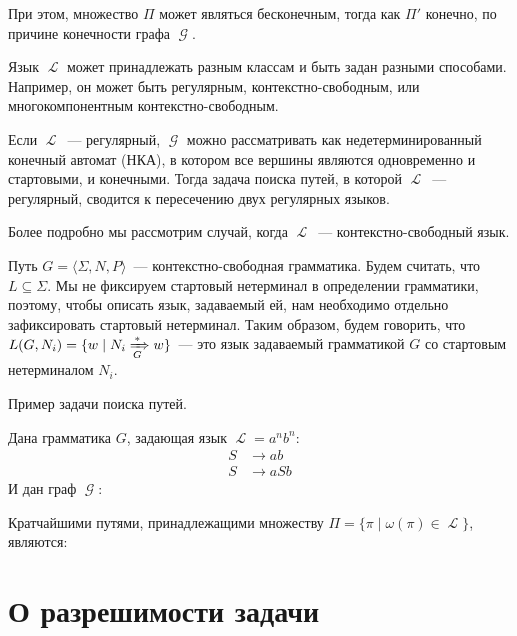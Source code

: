 При этом, множество $\Pi$ может являться бесконечным, тогда как $\Pi'$ конечно, по причине конечности графа $\mscrG$.

Язык $\mscrL$ может принадлежать разным классам и быть задан разными способами.
Например, он может быть регулярным, контекстно-свободным, или многокомпонентным контекстно-свободным.

Если $\mscrL$~--- регулярный, $\mscrG$ можно рассматривать как недетерминированный конечный автомат (НКА), в котором все вершины являются одновременно и стартовыми, и конечными.
Тогда задача поиска путей, в которой $\mscrL$~--- регулярный, сводится к пересечению двух регулярных языков.

Более подробно мы рассмотрим случай, когда $\mscrL$~--- контекстно-свободный язык.

Путь $G = \langle \Sigma, N, P \rangle$~--- контекстно-свободная грамматика.
Будем считать, что $L \subseteq \Sigma$.
Мы не фиксируем стартовый нетерминал в определении грамматики, поэтому, чтобы описать язык, задаваемый ей, нам необходимо отдельно зафиксировать стартовый нетерминал.
Таким образом, будем говорить, что $L(G,N_i) = \{ w \mid N_i \xRightarrow[G]{*} w  \}$~--- это язык задаваемый грамматикой $G$ со стартовым нетерминалом $N_i$.

\begin{example}
    Пример задачи поиска путей.

    Дана грамматика $G$, задающая язык $\mscrL = a^n b^n$:
    \begin{align*}
        S & \to a b   \\
        S & \to a S b
    \end{align*}
    И дан граф $\mscrG$:
    \begin{center}
        
    \end{center}

    Кратчайшими путями, принадлежащими множеству $\Pi = \{\pi \mid \omega(\pi) \in \mscrL\}$, являются:

    \begin{center}
        
    \end{center}

    \begin{center}
        
    \end{center}

\end{example}


\section{О разрешимости задачи}

